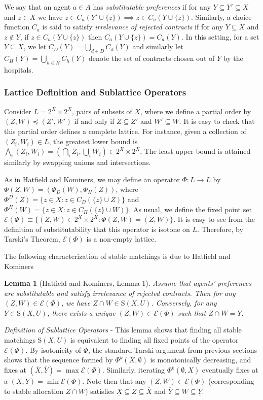 \documentclass[11pt,reqno]{amsart}
\newtheorem{lemma}[thm]{Lemma}
\theoremstyle{definition}
\numberwithin{equation}{section}
\newcommand{\lft}{\left(}
\newcommand{\rt}{\right)}
\newcommand{\ol}{\overline}
\newcommand{\ul}{\underline}
\newcommand{\sub}{\subseteq}
\newcommand{\stable}{\mathrm{S}(X,U)}
\newcommand{\fix}{\mathcal{E}}
\newcommand{\peq}{\preceq}
\newcommand{\lattice}{L}
\newcommand{\topx}{\ol{X}}
\newcommand{\topy}{\ol{Y}}
\newcommand{\botx}{\ul{X}}
\newcommand{\boty}{\ul{Y}}
\begin{document}
We say that an agent $a \in A$ has \emph{substitutable preferences} if for any $Y \sub Y' \sub X$ and $z \in X$ we have $z \in C_a(Y' \cup \{ z \}) \implies z \in C_a(Y \cup \{z \})$. 
Similarly, a choice function $C_a$ is said to satisfy \emph{irrelevance of rejected contracts} if for any $Y \sub X$ and $z \not \in Y$, if $z \in C_a(Y \cup \{ z \})$ then $C_a(Y \cup \{z\}) = C_a(Y)$.
In this setting, for a set $Y \sub X$, we let $C_D(Y) = \bigcup_{d \in D} C_d(Y)$ and similarly let $C_H(Y) = \bigcup_{h \in H} C_h(Y)$ denote the set of contracts chosen out of $Y$ by the hospitals.

\subsubsection{Lattice Definition and Sublattice Operators}

Consider $\lattice = 2^X \times 2^X$, pairs of subsets of $X$, where we define a partial order by $(Z,W) \peq (Z',W')$ if and only if $Z \sub Z'$ and $W' \sub W$. 
It is easy to check that this partial order defines a complete lattice.
For instance, given a collection of $(Z_i, W_i) \in \lattice$, the greatest lower bound is $\bigwedge_i (Z_i, W_i) = \lft \bigcap_i Z_i, \bigcup_i W_i \rt \in 2^X \times 2^X$.
The least upper bound is attained similarly by swapping unions and intersections. 

As in Hatfield and Kominers, we may define an operator $\Phi: \lattice \to \lattice$ by $\Phi(Z,W) = (\Phi_D(W), \Phi_H(Z))$, where $\Phi^D(Z) = \{z \in X: z \in C_D(\{z \} \cup Z) \}$ and $\Phi^H(W) = \{z \in X: z \in C_H(\{z \} \cup W) \}$.
As usual, we define the fixed point set $\fix(\Phi) \equiv \{(Z,W) \in 2^X \times 2^X: \Phi(Z,W) = (Z,W) \}$.
It is easy to see from the definition of substitutability that this operator is isotone on $\lattice$.
Therefore, by Tarski's Theorem, $\fix(\Phi)$ is a non-empty lattice.

The following characterization of stable matchings is due to Hatfield and Kominers
\begin{lemma}[Hatfield and Kominers, Lemma 1] \label{lemma:hk}
Assume that agents' preferences are substitutable and satisfy irrelevance of rejected contracts.
Then for any $(Z,W) \in \fix(\Phi)$, we have $Z\cap W \in \stable$.
Conversely, for any $Y\in \stable$, there exists a unique $(Z,W) \in \fix(\Phi)$ such that $Z \cap W = Y$.
\end{lemma}

\emph{Definition of Sublattice Operators} - This lemma shows that finding all stable matchings $\stable$ is equivalent to finding all fixed points of the operator $\fix(\Phi)$.
By isotonicity of $\Phi$, the standard Tarski argument from previous sections shows that the sequence formed by $\Phi^k(X, \emptyset)$ is monotonically decreasing, and fixes at $(\topx, \topy) = \max \fix(\Phi)$.
Similarly, iterating $\Phi^k(\emptyset, X)$ eventually fixes at a $(\botx, \boty) = \min \fix( \Phi)$.
Note then that any $(Z,W) \in \fix(\Phi)$ (corresponding to stable allocation $Z \cap W$) satisfies $\botx \sub Z \sub \topx$ and $\topy \sub W \sub \boty$.
\end{document}
